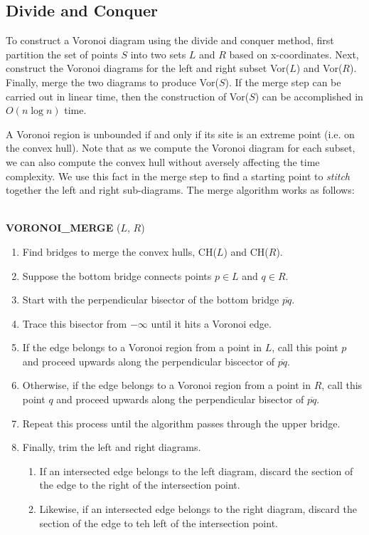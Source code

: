 \subsection{Divide and Conquer}

To construct a Voronoi diagram using the divide and conquer method,
first partition the set of points $S$ into two sets $L$ and $R$ based
on x-coordinates.  Next, construct the Voronoi diagrams for the left
and right subset Vor($L$) and Vor($R$).  Finally, merge the two
diagrams to produce Vor($S$).  If the merge step can be carried out in
linear time, then the construction of Vor($S$) can be accomplished in
$O(n \log n)$ time.


A Voronoi region is unbounded if and only if its site is an extreme
point (i.e. on the convex hull).  Note that as we compute the Voronoi
diagram for each subset, we can also compute the convex hull without
aversely affecting the time complexity.  We use this fact in the merge
step to find a starting point to {\em stitch} together the left and
right sub-diagrams. The merge algorithm works as follows:

\parbox{4.5in}{
\hrulefill \\
{\bf VORONOI\_MERGE} ($L$, $R$)
\begin{enumerate}

\item Find bridges to merge the convex hulls, CH($L$) and CH($R$).

\item Suppose the bottom bridge connects points $p \in L$ and $q \in
R$.
 \item Start with the perpendicular bisector of the bottom bridge
$\overline{pq}$.

\item Trace this bisector from $-\infty$ until it hits a Voronoi edge.

\item If the edge belongs to a Voronoi region from a point in $L$,
call this point $p$ and proceed upwards along the perpendicular
biscector of $\overline{pq}$.

\item Otherwise, if the edge belongs to a Voronoi region from a point
in $R$, call this point $q$ and proceed upwards along the
perpendicular bisector of $\overline{pq}$.

\item Repeat this process until the algorithm passes through the upper
bridge.

\item Finally, trim the left and right diagrams.
\begin{enumerate}
\item If an intersected edge belongs to the left diagram, discard the
section of the edge to the right of the intersection point. 
\item Likewise, if an intersected edge belongs to the right diagram, 
discard the section of the edge to teh left of the intersection point.
\end{enumerate}
\end{enumerate}
\hrulefill}

